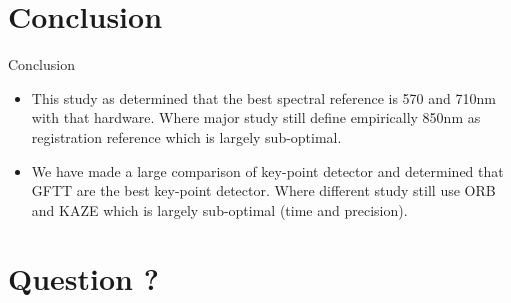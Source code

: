 \documentclass{beamer}
\begin{document}
	\section{Conclusion}
	
		\begin{frame}{Conclusion}
			\begin{itemize}
				\item This study as determined that the best spectral reference is 570 and 710nm with that hardware.
				Where major study still define empirically 850nm as registration reference which is largely sub-optimal.
				\item We have made a large comparison of key-point detector and determined that GFTT are the best key-point detector.
				Where different study still use ORB and KAZE which is largely sub-optimal (time and precision).
			\end{itemize}
		\end{frame}
	
	\section{Question ?}
			
\end{document}
